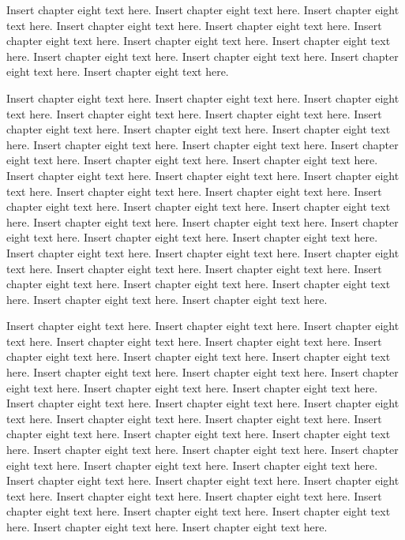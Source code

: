 Insert chapter eight text here. Insert chapter eight text here. Insert chapter eight text here. Insert chapter eight text here. Insert chapter eight text here. Insert chapter eight text here. Insert chapter eight text here. Insert chapter eight text here. Insert chapter eight text here. Insert chapter eight text here. Insert chapter eight text here. Insert chapter eight text here.

Insert chapter eight text here. Insert chapter eight text here. Insert chapter eight text here. Insert chapter eight text here. Insert chapter eight text here. Insert chapter eight text here. Insert chapter eight text here. Insert chapter eight text here. Insert chapter eight text here. Insert chapter eight text here. Insert chapter eight text here. Insert chapter eight text here. Insert chapter eight text here. Insert chapter eight text here. Insert chapter eight text here. Insert chapter eight text here. Insert chapter eight text here. Insert chapter eight text here. Insert chapter eight text here. Insert chapter eight text here. Insert chapter eight text here. Insert chapter eight text here. Insert chapter eight text here. Insert chapter eight text here. Insert chapter eight text here. Insert chapter eight text here. Insert chapter eight text here. Insert chapter eight text here. Insert chapter eight text here. Insert chapter eight text here. Insert chapter eight text here. Insert chapter eight text here. Insert chapter eight text here. Insert chapter eight text here. Insert chapter eight text here. Insert chapter eight text here.

Insert chapter eight text here. Insert chapter eight text here. Insert chapter eight text here. Insert chapter eight text here. Insert chapter eight text here. Insert chapter eight text here. Insert chapter eight text here. Insert chapter eight text here. Insert chapter eight text here. Insert chapter eight text here. Insert chapter eight text here. Insert chapter eight text here. Insert chapter eight text here. Insert chapter eight text here. Insert chapter eight text here. Insert chapter eight text here. Insert chapter eight text here. Insert chapter eight text here. Insert chapter eight text here. Insert chapter eight text here. Insert chapter eight text here. Insert chapter eight text here. Insert chapter eight text here. Insert chapter eight text here. Insert chapter eight text here. Insert chapter eight text here. Insert chapter eight text here. Insert chapter eight text here. Insert chapter eight text here. Insert chapter eight text here. Insert chapter eight text here. Insert chapter eight text here. Insert chapter eight text here. Insert chapter eight text here. Insert chapter eight text here. Insert chapter eight text here.

